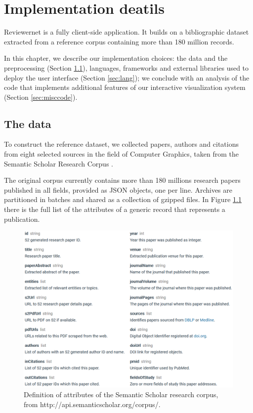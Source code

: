\chapter{Implementation deatils}
\label{sec:impl}
Reviewernet is a fully client-side application. It builds on a bibliographic dataset extracted from a reference corpus containing more than 180 million records.

In this chapter, we describe our implementation choices: the data and the preprocessing  (Section \ref{sec:data}), languages, frameworks and external libraries used to deploy the user interface (Section \ref{sec:lang}); we conclude with an analysis of the code that implements additional features of our interactive visualization system (Section \ref{sec:misccode}).
\section{The data}
\label{sec:data}
To construct the reference dataset, we collected papers, authors and citations from eight selected sources in the field of Computer Graphics, taken from the Semantic Scholar Research Corpus \cite{ammar:18}. 

The original corpus currently contains more than 180 millions research papers published in all fields, provided as JSON objects, one per line. Archives are partitioned in batches and shared as a collection of gzipped files. In Figure \ref{jsonfields} there is the full list of the attributes of a generic record that represents a publication.

\begin{figure}[!ht]
    \centering
    \includegraphics[width=\textwidth]{fig/corpusfields.png}
    \caption{Definition of attributes of the Semantic Scholar research corpus, from http://api.semanticscholar.org/corpus/. \label{jsonfields}}
\end{figure}

